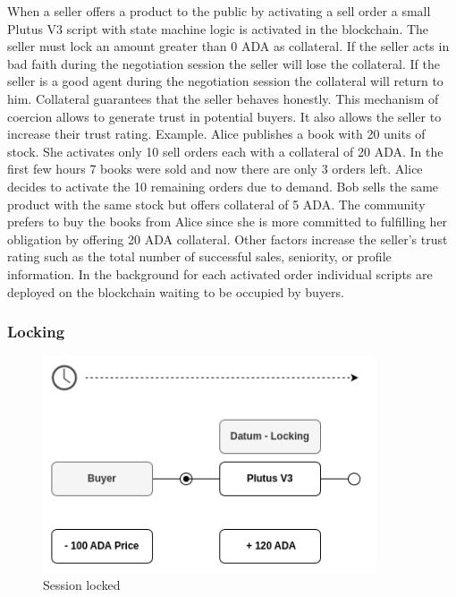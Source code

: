 \documentclass[12pt]{article}
\begin{document}
When a seller offers a product to the public by activating a sell order a small Plutus V3 script with state machine logic is activated in the blockchain.
The seller must lock an amount greater than 0 ADA as collateral. 
If the seller acts in bad faith during the negotiation session the seller will lose the collateral.
If the seller is a good agent during the negotiation session the collateral will return to him.
Collateral guarantees that the seller behaves honestly.
This mechanism of coercion allows to generate trust in potential buyers. 
It also allows the seller to increase their trust rating. Example. Alice publishes a book with 20 units of stock.
She activates only 10 sell orders each with a collateral of 20 ADA.
In the first few hours 7 books were sold and now there are only 3 orders left.
Alice decides to activate the 10 remaining orders due to demand.
Bob sells the same product with the same stock but offers collateral of 5 ADA. The community prefers to buy the books from Alice since she is more committed to fulfilling her obligation by offering 20 ADA collateral.
Other factors increase the seller's trust rating such as the total number of successful sales, seniority, or profile information.
In the background for each activated order individual scripts are deployed on the blockchain waiting to be occupied by buyers.

\subsubsection { Locking }

\begin{figure}[ht]
  \centering
  \includegraphics[width=0.88\textwidth, keepaspectratio]{2.png}
  \caption{Session locked}
  \label{fig:locking}
\end{figure}
\end{document}
